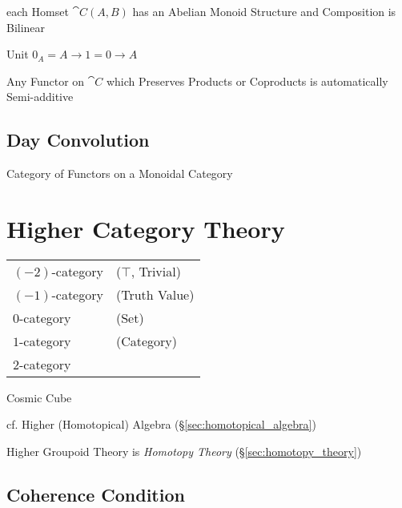 each Homset $\cat{C}(A,B)$ has an Abelian Monoid Structure and
Composition is Bilinear

Unit $0_A = A \rightarrow 1 = 0 \rightarrow A$

Any Functor on $\cat{C}$ which Preserves Products or Coproducts is
automatically Semi-additive



\subsection{Day Convolution}\label{sec:day_convolution}


Category of Functors on a Monoidal Category



\section{Higher Category Theory}\label{sec:higher_category}

\begin{tabular}{l l}
  $(-2)$-category   & ($\top$, Trivial) \\
  $(-1)$-category   & (Truth Value) \\
  $0$-category      & (Set) \\
  $1$-category      & (Category) \\
  $2$-category      & \\
\end{tabular}

Cosmic Cube %

cf. Higher (Homotopical) Algebra (\S\ref{sec:homotopical_algebra})

\fist Higher Groupoid Theory is \emph{Homotopy Theory}
(\S\ref{sec:homotopy_theory})



\subsection{Coherence Condition}\label{sec:coherence_condition}

